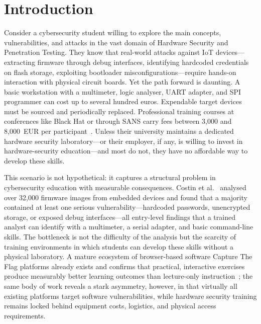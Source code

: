 \chapter{Introduction}\label{chap:intro}

Consider a cybersecurity student willing to explore the main concepts, vulnerabilities, and attacks in the vast domain of Hardware Security and Penetration Testing. They know that real-world attacks against IoT devices---extracting firmware through debug interfaces, identifying hardcoded credentials on flash storage, exploiting bootloader misconfigurations---require hands-on interaction with physical circuit boards. Yet the path forward is daunting. A basic workstation with a multimeter, logic analyser, UART adapter, and SPI programmer can cost up to several hundred euros. Expendable target devices must be sourced and periodically replaced. Professional training courses at conferences like Black Hat or through SANS carry fees between 3{,}000 and 8{,}000~EUR per participant~\cite{genova2025}. Unless their university maintains a dedicated hardware security laboratory---or their employer, if any, is willing to invest in hardware-security education---and most do not, they have no affordable way to develop these skills.

This scenario is not hypothetical: it captures a structural problem in cybersecurity education with measurable consequences. Costin et al.~\cite{costin2014large} analysed over 32{,}000 firmware images from embedded devices and found that a majority contained at least one serious vulnerability---hardcoded passwords, unencrypted storage, or exposed debug interfaces---all entry-level findings that a trained analyst can identify with a multimeter, a serial adapter, and basic command-line skills. The bottleneck is not the difficulty of the analysis but the scarcity of training environments in which students can develop these skills without a physical laboratory. A mature ecosystem of browser-based software Capture The Flag platforms already exists and confirms that practical, interactive exercises produce measurably better learning outcomes than lecture-only instruction~\cite{svabensky2020}; the same body of work reveals a stark asymmetry, however, in that virtually all existing platforms target software vulnerabilities, while hardware security training remains locked behind equipment costs, logistics, and physical access requirements.

